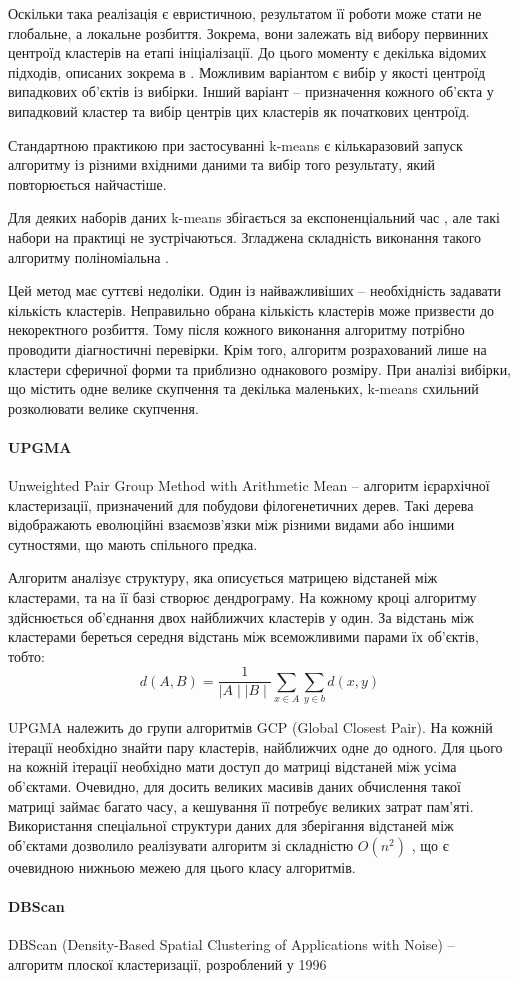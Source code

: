         Оскільки така реалізація є евристичною, результатом її роботи може стати не глобальне, а локальне розбиття. Зокрема, вони залежать від вибору первинних центроїд кластерів на етапі ініціалізації. До цього моменту є декілька відомих підходів, описаних зокрема в \cite{HamerlyKMeansOptimization}. Можливим варіантом є вибір у якості центроїд випадкових об'єктів із вибірки. Інший варіант -- призначення кожного об'єкта у випадковий кластер та вибір центрів цих кластерів як початкових центроїд.
        
        Стандартною практикою при застосуванні k-means є кількаразовий запуск алгоритму із різними вхідними даними та вибір того результату, який повторюється найчастіше.
        
        Для деяких наборів даних k-means збігається за експоненціальний час \cite{KMeansWorstCaseComplexity}, але такі набори на практиці не зустрічаються. Згладжена складність виконання такого алгоритму поліноміальна \cite{KMeansSmoothedComplexity}. 
        
        Цей метод має суттєві недоліки. Один із найважливіших -- необхідність задавати кількість кластерів. Неправильно обрана кількість кластерів може призвести до некоректного розбиття. Тому після кожного виконання алгоритму потрібно проводити діагностичні перевірки. Крім того, алгоритм розрахований лише на кластери сферичної форми та приблизно однакового розміру. При аналізі вибірки, що містить одне велике скупчення та декілька маленьких, k-means схильний розколювати велике скупчення.
        
    \paragraph {UPGMA}
        Unweighted Pair Group Method with Arithmetic Mean -- алгоритм ієрархічної кластеризації, призначений для побудови філогенетичних дерев. Такі дерева відображають еволюційні взаємозв'язки між різними видами або іншими сутностями, що мають спільного предка.
        
        Алгоритм аналізує структуру, яка описується матрицею відстаней між кластерами, та на її базі створює дендрограму. На кожному кроці алгоритму здйснюється об'єднання двох найближчих кластерів у один. За відстань між кластерами береться середня відстань між всеможливими парами їх об'єктів, тобто:
        \[
            d(A, B) = \frac{1}{\mid A \mid \mid B \mid} \sum_{x \in A} \sum_{y \in b} d(x, y)
        \]
        
        UPGMA належить до групи алгоритмів GCP (Global Closest Pair). На кожній ітерації необхідно знайти пару кластерів, найближчих одне до одного. Для цього на кожній ітерації необхідно мати доступ до матриці відстаней між усіма об'єктами. Очевидно, для досить великих масивів даних обчислення такої матриці займає багато часу, а кешування її потребує великих затрат пам'яті. Використання спеціальної структури даних для зберігання відстаней між об'єктами дозволило реалізувати алгоритм зі складністю $O(n^2)$ \cite{Eppstein}, що є очевидною нижньою межею для цього класу алгоритмів.
        
    \paragraph {DBScan}
    
    DBScan (Density-Based Spatial Clustering of Applications with Noise) -- алгоритм плоскої кластеризації, розроблений у 1996 \cite{DBScan}
